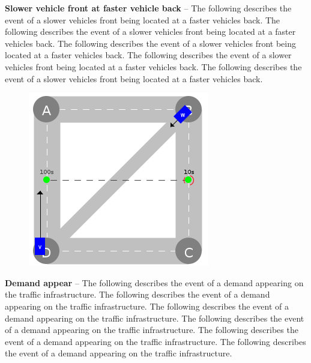 \documentclass[graybox]{svmult}
\begin{document}
\noindent
\textbf{Slower vehicle front at faster vehicle back}
--
The following describes the event of a slower vehicles front being located at a faster vehicles back.
The following describes the event of a slower vehicles front being located at a faster vehicles back.
The following describes the event of a slower vehicles front being located at a faster vehicles back.
The following describes the event of a slower vehicles front being located at a faster vehicles back.
The following describes the event of a slower vehicles front being located at a faster vehicles back.


\vspace{4mm}

\begin{figure}
	\centering
		\includegraphics[scale=0.35]{../../events/demand.png}
\end{figure}

\noindent
\textbf{Demand appear}
--
The following describes the event of a demand appearing on the traffic infrastructure.
The following describes the event of a demand appearing on the traffic infrastructure.
The following describes the event of a demand appearing on the traffic infrastructure.
The following describes the event of a demand appearing on the traffic infrastructure.
The following describes the event of a demand appearing on the traffic infrastructure.
The following describes the event of a demand appearing on the traffic infrastructure.

\vspace{4mm}
\end{document}
